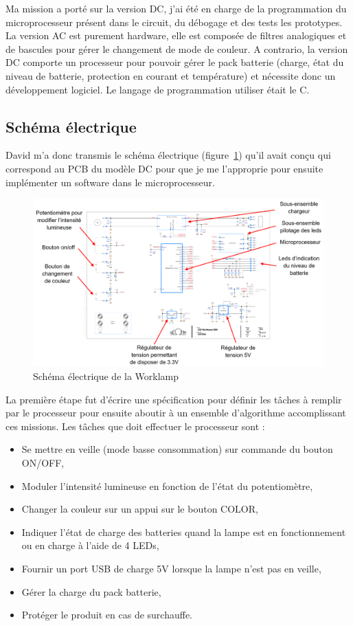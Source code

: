 \documentclass[a4paper, 12pt, sffamily]{report}
\begin{document}
Ma mission a porté sur la version DC, j’ai été en charge de la programmation du microprocesseur présent dans le circuit, du débogage et des tests les prototypes. La version AC est purement hardware, elle est composée de filtres analogiques et de bascules pour gérer le changement de mode de couleur. A contrario, la version DC comporte un processeur pour pouvoir gérer le pack batterie (charge, état du niveau de batterie, protection en courant et température) et nécessite donc un développement logiciel. Le langage de programmation utiliser était le C.

\subsection{Schéma électrique}
David m’a donc transmis le schéma électrique (figure~\ref{fig:worklamp_schema}) qu’il avait conçu qui correspond au PCB du modèle DC pour que je me l’approprie pour ensuite implémenter un software dans le microprocesseur.

\begin{figure}[h]
\centering
\includegraphics[scale=0.51]{figures/screenshots/version_A3_worklamp.png}
\caption{Schéma électrique de la Worklamp}
\label{fig:worklamp_schema}
\end{figure}

La première étape fut d’écrire une spécification pour définir les tâches à remplir par le processeur pour ensuite aboutir à un ensemble d’algorithme accomplissant ces missions.
Les tâches que doit effectuer le processeur sont :
\begin{itemize} %
\item Se mettre en veille (mode basse consommation) sur commande du bouton ON/OFF,
\item Moduler l’intensité lumineuse en fonction de l’état du potentiomètre,
\item Changer la couleur sur un appui sur le bouton COLOR,
\item Indiquer l’état de charge des batteries quand la lampe est en fonctionnement ou en charge à l’aide de 4 LEDs,
\item Fournir un port USB de charge 5V lorsque la lampe n’est pas en veille,
\item Gérer la charge du pack batterie,
\item Protéger le produit en cas de surchauffe.
\end{itemize}
\end{document}
